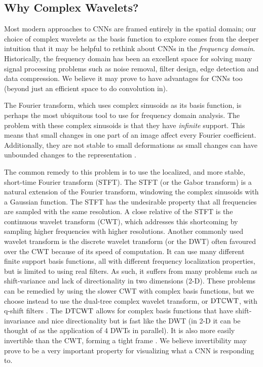 \subsection{Why Complex Wavelets?}
Most modern approaches to CNNs are framed entirely in the spatial domain; our
choice of complex wavelets as the basis function to explore comes from the
deeper intuition that it may be helpful to rethink about CNNs in the
\emph{frequency domain}.  Historically, the frequency domain has been an
excellent space for solving many signal processing problems such as noise
removal, filter design, edge detection and data compression. We believe it may prove to
have advantages for CNNs too (beyond just an efficient space to do convolution
in). 

The Fourier transform, which uses complex sinusoids as 
its basis function, is perhaps the most ubiquitous tool to use for frequency
domain analysis. The problem with these complex sinusoids is that they have
\emph{infinite} support. This means that small changes in one part of an image
affect every Fourier coefficient. Additionally, they are not stable to small
deformations as small changes can have unbounded changes to the representation
\cite{mallat_group_2012}. 

The common remedy to this problem is to use the localized, and more
stable, short-time Fourier transform (STFT). The STFT (or the Gabor transform)
is a natural extension of the Fourier transform, windowing the complex sinusoids
with a Gaussian function. The STFT has the undesirable property that all
frequencies are sampled with the same resolution. A close relative of the STFT is the 
continuous wavelet transform (CWT), which addresses this shortcoming by 
sampling higher frequencies with higher resolutions. Another commonly used
wavelet transform is the discrete wavelet transform (or the DWT) often favoured over 
the CWT because of its speed of computation. It can use many
different finite support basis functions, all with different frequency
localization properties, but is limited to using real filters. As such, it
suffers from many problems such as shift-variance and lack of directionality in
two dimensions (2-D). These problems can be remedied by using the slower CWT with complex basis
functions, but we choose instead to use the dual-tree complex wavelet transform,
or $\mathrm{DT}\mathbb{C}\mathrm{WT}$, \cite{selesnick_dual-tree_2005} with q-shift filters \cite{kingsbury_complex_2001}. 
The $\mathrm{DT}\mathbb{C}\mathrm{WT}$ allows for complex basis functions that have shift-invariance and
nice directionality but is fast like the DWT (in 2-D it can be thought of as the
application of 4 DWTs in parallel). It is also more easily invertible than the
CWT, forming a tight frame \cite{kovacevic_introduction_2008}. We believe
invertibility may prove to be a very important property for visualizing what a
CNN is responding to.

